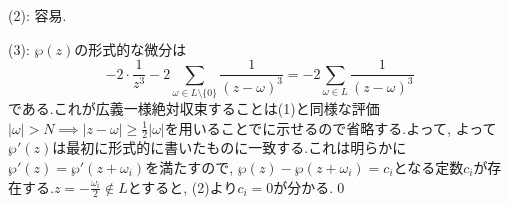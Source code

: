 (2): 容易.

(3): $\wp(z)$の形式的な微分は
\[-2\cdot \dfrac{1}{z^3} -2\sum_{\omega\in L\setminus{\{ 0 \}}} \dfrac{1}{(z-\omega)^3}  = -2\sum_{\omega\in L} \dfrac{1}{(z-\omega)^3} \]
である.これが広義一様絶対収束することは(1)と同様な評価$|\omega| > N \implies |z-\omega| \geq \frac{1}{2}|\omega|$を用いることでに示せるので省略する.よって,   よって$\wp'(z)$は最初に形式的に書いたものに一致する.これは明らかに$\wp'(z) = \wp'(z+\omega_i)$を満たすので, $\wp(z) - \wp(z+\omega_i) = c_i$となる定数$c_i$が存在する.$z=-\frac{\omega_i}{2}\notin L$とすると, (2)より$c_i = 0$が分かる.\qed
\newpage














